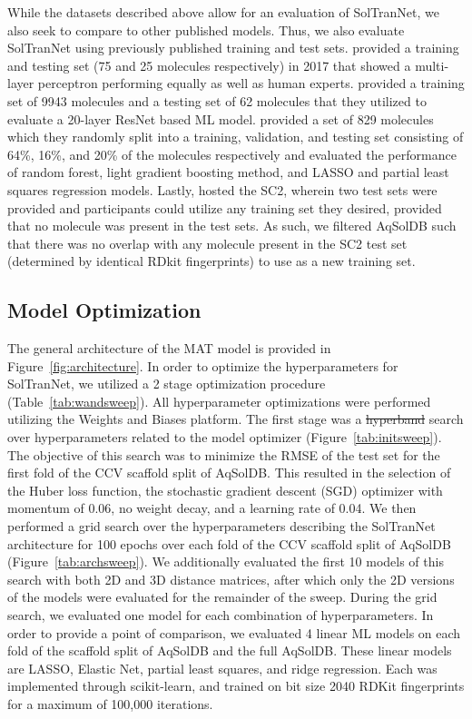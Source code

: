 \documentclass[journal=jcim,manuscript=applicationnotes]{achemso} %
\providecommand{\DIFaddtex}[1]{{\protect\color{blue}\uwave{#1}}} %
\providecommand{\DIFdeltex}[1]{{\protect\color{red}\sout{#1}}}                      %
\providecommand{\DIFaddbegin}{} %
\providecommand{\DIFaddend}{} %
\providecommand{\DIFdelbegin}{} %
\providecommand{\DIFdelend}{} %
\providecommand{\DIFadd}[1]{\texorpdfstring{\DIFaddtex{#1}}{#1}} %
\providecommand{\DIFdel}[1]{\texorpdfstring{\DIFdeltex{#1}}{}} %
\begin{document}
While the datasets described above allow for an evaluation of SolTranNet, we also seek to compare to other published models.
Thus, we also evaluate SolTranNet using previously published training and test sets.
\citet{boobier} provided a training and testing set (75 and 25 molecules respectively) in 2017 that showed a multi-layer perceptron performing equally as well as human experts.
\citet{cui} provided a training set of 9943 molecules and a testing set of 62 molecules that they utilized to evaluate a 20-layer ResNet based ML model.
\citet{lovric} provided a set of 829 molecules which they randomly split into a training, validation, and testing set consisting of 64\%, 16\%, and 20\% of the molecules respectively and evaluated the performance of random forest, light gradient boosting method, and LASSO and partial least squares regression models.
Lastly, \citet{llinas} hosted the SC2, wherein two test sets were provided and participants could utilize any training set they desired, provided that no molecule was present in the test sets.
As such, we filtered AqSolDB such that there was no overlap with any molecule present in the SC2 test set (determined by identical RDkit fingerprints) to use as a new training set.

\subsection{Model Optimization}
The general architecture of the MAT model is provided in Figure~\ref{fig:architecture}.
In order to optimize the hyperparameters for SolTranNet, we utilized a 2 stage optimization procedure (Table~\ref{tab:wandsweep}).
All hyperparameter optimizations were performed utilizing the Weights and Biases platform\cite{wandb}.
The first stage was a \DIFdelbegin \DIFdel{hyperband }\DIFdelend \DIFaddbegin \DIFadd{Bayesian with hyperband stopping criteria }\DIFaddend search over hyperparameters related to the model optimizer (Figure~\ref{tab:initsweep}). 
The objective of this search was to minimize the RMSE of the test set for the first fold of the CCV scaffold split of AqSolDB.
This resulted in the selection of the Huber loss function, the stochastic gradient descent (SGD) optimizer with momentum of 0.06, no weight decay, and a learning rate of 0.04.
We then performed a grid search over the hyperparameters describing the SolTranNet architecture for 100 epochs over each fold of the CCV scaffold split of AqSolDB (Figure~\ref{tab:archsweep}).
We additionally evaluated the first 10 models of this search with both 2D and 3D distance matrices, after which only the 2D versions of the models were evaluated for the remainder of the sweep.
During the grid search, we evaluated one model for each combination of hyperparameters.
In order to provide a point of comparison, we evaluated 4 linear ML models on each fold of the scaffold split of AqSolDB and the full AqSolDB.
These linear models are LASSO, Elastic Net, partial least squares, and ridge regression.
Each was implemented through scikit-learn\cite{scikit-learn}, and trained on bit size 2040 RDKit fingerprints for a maximum of 100,000 iterations.
\end{document}
